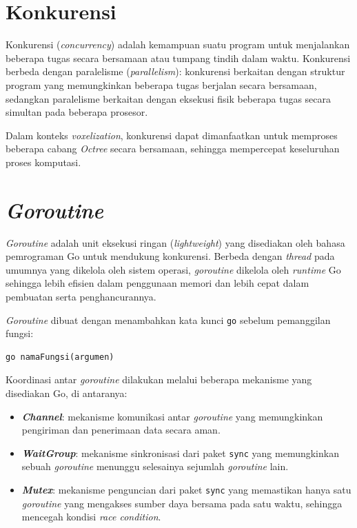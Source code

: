 \section{Konkurensi}

Konkurensi (\textit{concurrency}) adalah kemampuan suatu program untuk menjalankan
beberapa tugas secara bersamaan atau tumpang tindih dalam waktu. Konkurensi berbeda
dengan paralelisme (\textit{parallelism}): konkurensi berkaitan dengan struktur
program yang memungkinkan beberapa tugas berjalan secara bersamaan, sedangkan
paralelisme berkaitan dengan eksekusi fisik beberapa tugas secara simultan pada
beberapa prosesor.

Dalam konteks \textit{voxelization}, konkurensi dapat dimanfaatkan untuk memproses
beberapa cabang \textit{Octree} secara bersamaan, sehingga mempercepat keseluruhan
proses komputasi.

\section{\textit{Goroutine}}

\textit{Goroutine} adalah unit eksekusi ringan (\textit{lightweight}) yang
disediakan oleh bahasa pemrograman Go untuk mendukung konkurensi. Berbeda dengan
\textit{thread} pada umumnya yang dikelola oleh sistem operasi, \textit{goroutine}
dikelola oleh \textit{runtime} Go sehingga lebih efisien dalam penggunaan memori
dan lebih cepat dalam pembuatan serta penghancurannya.

\textit{Goroutine} dibuat dengan menambahkan kata kunci \texttt{go} sebelum
pemanggilan fungsi:
\begin{verbatim}
go namaFungsi(argumen)
\end{verbatim}

Koordinasi antar \textit{goroutine} dilakukan melalui beberapa mekanisme yang
disediakan Go, di antaranya:

\begin{itemize}
    \item \textbf{\textit{Channel}}: mekanisme komunikasi antar \textit{goroutine}
          yang memungkinkan pengiriman dan penerimaan data secara aman.

    \item \textbf{\textit{WaitGroup}}: mekanisme sinkronisasi dari paket
          \texttt{sync} yang memungkinkan sebuah \textit{goroutine} menunggu selesainya
          sejumlah \textit{goroutine} lain.

    \item \textbf{\textit{Mutex}}: mekanisme penguncian dari paket \texttt{sync}
          yang memastikan hanya satu \textit{goroutine} yang mengakses sumber daya
          bersama pada satu waktu, sehingga mencegah kondisi \textit{race condition}.
\end{itemize}


